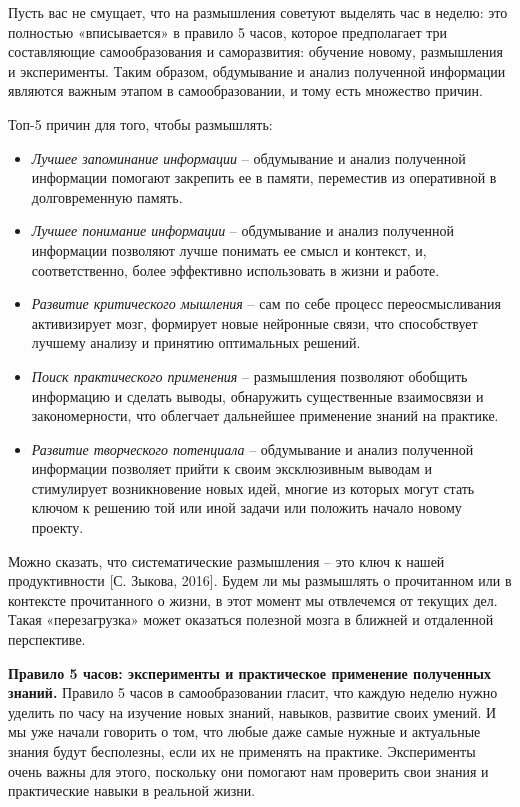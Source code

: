 Пусть вас не смущает, что на размышления советуют выделять час в неделю: это полностью «вписывается» в правило 5 часов, которое предполагает три составляющие самообразования и саморазвития: обучение новому, размышления и эксперименты. Таким образом, обдумывание и анализ полученной информации являются важным этапом в самообразовании, и тому есть множество причин.

Топ-5 причин для того, чтобы размышлять:
\begin{itemize}[noitemsep, label=--]
    \item \textit{Лучшее запоминание информации} – обдумывание и анализ полученной информации помогают закрепить ее в памяти, переместив из оперативной в долговременную память.
    \item \textit{Лучшее понимание информации} – обдумывание и анализ полученной информации позволяют лучше понимать ее смысл и контекст, и, соответственно, более эффективно использовать в жизни и работе.
    \item \textit{Развитие критического мышления} – сам по себе процесс переосмысливания активизирует мозг, формирует новые нейронные связи, что способствует лучшему анализу и принятию оптимальных решений.
    \item \textit{Поиск практического применения} – размышления позволяют обобщить информацию и сделать выводы, обнаружить существенные взаимосвязи и закономерности, что облегчает дальнейшее применение знаний на практике.
    \item \textit{Развитие творческого потенциала} – обдумывание и анализ полученной информации позволяет прийти к своим эксклюзивным выводам и стимулирует возникновение новых идей, многие из которых могут стать ключом к решению той или иной задачи или положить начало новому проекту.
\end{itemize}

Можно сказать, что систематические размышления – это ключ к нашей продуктивности [С. Зыкова, 2016]. Будем ли мы размышлять о прочитанном или в контексте прочитанного о жизни, в этот момент мы отвлечемся от текущих дел. Такая «перезагрузка» может оказаться полезной мозга в ближней и отдаленной перспективе.

\textbf{Правило 5 часов: эксперименты и практическое применение полученных знаний.}
Правило 5 часов в самообразовании гласит, что каждую неделю нужно уделить по часу на изучение новых знаний, навыков, развитие своих умений. И мы уже начали говорить о том, что любые даже самые нужные и актуальные знания будут бесполезны, если их не применять на практике. Эксперименты очень важны для этого, поскольку они помогают нам проверить свои знания и практические навыки в реальной жизни.

